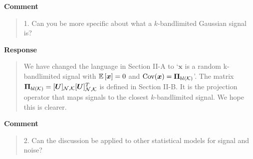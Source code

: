 \documentclass[11pt,onecolumn,journal]{IEEEtran}
\newcommand{\vect}[1]{\bm{#1}}
\theoremstyle{definition}
\newcommand{\matrsubU}[1]{\matrsub[#1, K]{U}}
\begin{document}
\textbf{Comment}
\begin{quote}
1. Can you be more specific about what a $k$-bandlimited Gaussian signal is?
\end{quote}

\textbf{Response}
\begin{quote}
We have changed the language in Section II-A to `$\vect{x}$ is a random k-bandlimited signal with $\expect{\vect{x}}= 0$ and $\text{Cov}(\vect{x}) = \projbl$'. The matrix $\projbl = \matrsubU{N}\matrsubU{N}^{T}$ is defined in Section II-B. It is the projection operator that maps signals to the closest $k$-bandlimited signal. We hope this is clearer.
\end{quote}

\textbf{Comment}
\begin{quote}
2. Can the discussion be applied to other statistical models for signal and noise?
\end{quote}
\end{document}
